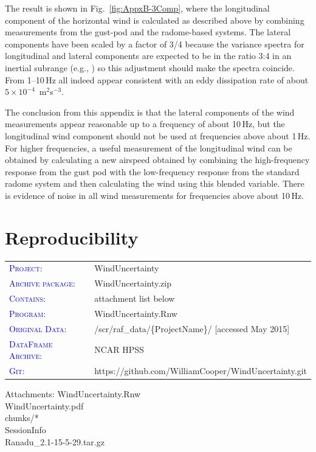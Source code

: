 \documentclass[12pt,twoside,english]{article}\usepackage[]{graphicx}\usepackage[]{color}
\providecommand{\tabularnewline}{\\}
\let\stdsection\section
\renewcommand{\section}{\newpage\stdsection}
\let\OrgIndex\index
\renewcommand*{\index}[1]{\OrgIndex{#1}}
\newenvironment{lyxlist}[1]
{\begin{list}{}
{\settowidth{\labelwidth}{#1}
\setlength{\leftmargin}{\labelwidth}
\addtolength{\leftmargin}{\labelsep}
\renewcommand{\makelabel}[1]{##1\hfil}}}
{\end{list}}
\newcommand{\attachm}[1]{\begin{lyxlist}{Attachments:00}
\item [Attachments:] {#1}
\end{lyxlist}}
\begin{document}
The result is shown in Fig.~\ref{fig:AppxB-3Comp}, where the longitudinal component of the horizontal wind is calculated as described above by combining measurements from the gust-pod and the radome-based systems. The lateral components have been scaled by a factor of 3/4 because the variance spectra for longitudinal and lateral components are expected to be in the ratio 3:4 in an inertial subrange (e.g., \citet{batchelor1953theory}) so this adjustment should make the spectra coincide. From 1--10\,Hz all indeed appear consistent with an eddy dissipation rate of about $5\times10^{-4}$~m$^{2}$s$^{-3}$. 

The conclusion from this appendix is that the lateral components of the wind measurements appear reasonable up to a frequency of about 10\,Hz, but the longitudinal wind component should not be used at frequencies above about 1\,Hz. For higher frequencies, a useful measurement of the longitudinal wind can be obtained by calculating a new airspeed obtained by combining the high-frequency response from the gust pod with the low-frequency response from the standard radome system and then calculating the wind using this blended variable. There is evidence of noise in all wind measurements for frequencies above about 10\,Hz. 

\section{Reproducibility}


\begin{tabular}{ll}
\textsf{\textsc{\textcolor{blue}{Project:}}} & WindUncertainty\tabularnewline
\textsf{\textsc{\textcolor{blue}{Archive package:}}} & WindUncertainty.zip\tabularnewline
\textsf{\textsc{\textcolor{blue}{Contains:}}} & attachment list below\tabularnewline
\textsf{\textsc{\textcolor{blue}{Program:}}} & WindUncertainty.Rnw\tabularnewline
\textsf{\textsc{\textcolor{blue}{Original Data:}}} & /scr/raf\_data/\{ProjectName\}/ [accessed May 2015] \tabularnewline
\textsf{\textsc{\textcolor{blue}{DataFrame Archive:}}} & NCAR HPSS\tabularnewline
\textsf{\textsc{\textcolor{blue}{Git:}}} & https://github.com/WilliamCooper/WindUncertainty.git\tabularnewline
\end{tabular}

\attachm{WindUncertainty.Rnw\\WindUncertainty.pdf\\chunks/*\\SessionInfo\\Ranadu\_2.1-15-5-29.tar.gz}
\end{document}
